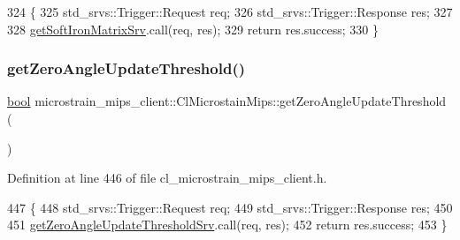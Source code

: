 \begin{DoxyCode}
324     \{
325         std\_srvs::Trigger::Request req;
326         std\_srvs::Trigger::Response res;
327 
328         \hyperlink{classmicrostrain__mips__client_1_1ClMicrostainMips_ad4ba8fa3476b9d63d9772aebe1295e0e}{getSoftIronMatrixSrv}.call(req, res);
329         \textcolor{keywordflow}{return} res.success;
330     \}
\end{DoxyCode}
\mbox{\label{classmicrostrain__mips__client_1_1ClMicrostainMips_a49a0db79d7d1790dc24b49a0493448ce}} 
\subsubsection{\texorpdfstring{get\+Zero\+Angle\+Update\+Threshold()}{getZeroAngleUpdateThreshold()}}
{\footnotesize\ttfamily \hyperlink{classbool}{bool} microstrain\+\_\+mips\+\_\+client\+::\+Cl\+Microstain\+Mips\+::get\+Zero\+Angle\+Update\+Threshold (\begin{DoxyParamCaption}{ }\end{DoxyParamCaption})\hspace{0.3cm}{\ttfamily [inline]}}



Definition at line 446 of file cl\+\_\+microstrain\+\_\+mips\+\_\+client.\+h.


\begin{DoxyCode}
447     \{
448         std\_srvs::Trigger::Request req;
449         std\_srvs::Trigger::Response res;
450 
451         \hyperlink{classmicrostrain__mips__client_1_1ClMicrostainMips_ad9cf264fdf8bf949b89a34bbebfa6c69}{getZeroAngleUpdateThresholdSrv}.call(req, res);
452         \textcolor{keywordflow}{return} res.success;
453     \}
\end{DoxyCode}
\mbox{\label{classmicrostrain__mips__client_1_1ClMicrostainMips_ad6fda769baae2bc623e2cca07d8250c0}} 
